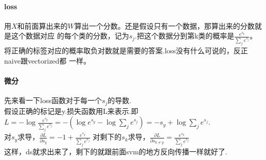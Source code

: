 \documentclass[fontset = none]{ctexart}
\begin{document}
\paragraph{loss}
用$X$和前面算出来的$W$算出一个分数。还是假设只有一个数据，那算出来的分数就是这个数据对应
的每个类的分数，记为$s_j$.把这个数据分到第k类的概率是$\frac{e^{s_k}}{\sum_j{e^{s_j}}}$。
将正确的标签对应的概率取负对数就是需要的答案.loss没有什么可说的，反正naive跟vectorized都
一样。
\paragraph{微分}
先来看一下loss函数对于每一个$s_j$的导数.\\
假设正确的标记是y.损失函数用L来表示.即$L=-\log{\frac{e^{s_y}}{\sum_j{e^{s_j}}}}=
-(\log{e^{s_y}} - \log{\sum_j e^{s_j}}) = -s_y + \log{\sum_j e^{s_j}}$.\\
对$s_y$求导，$\frac{\partial L}{\partial s_y}=-1+\frac{e^{s_y}}{\sum_j{e^{s_j}}}$
对剩下的$s_k$求导，$\frac{\partial L}{\partial s_{k \neq y}} =
\frac{e^{s_k}}{\sum_j{e^{s_j}}}$\\
这样，ds就求出来了，剩下的就跟前面svm的地方反向传播一样就好了.
\end{document}
